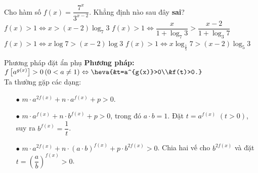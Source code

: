 \begin{ex}%
	Cho hàm số $f(x)=\dfrac{7^x}{3^{x-2}}$. Khẳng định nào sau đây \textbf{sai}?
	\choice
	{$f(x)>1\Leftrightarrow x>(x-2)\log_7 3$}
	{$f(x)>1\Leftrightarrow\dfrac{x}{1+\log_7 3}>\dfrac{x-2}{1+\log_3 7}$}
	{$f(x)>1\Leftrightarrow x\log 7>(x-2)\log 3$}
	{\True $f(x)>1\Leftrightarrow x\log_{\tfrac{1}{5}}7>(x-2)\log_5 3$}
\end{ex}
\begin{dang}{Phương pháp đặt ẩn phụ}
	\textbf{Phương pháp:} $f\left[a^{g(x)}\right]>0\,(0<a\neq 1)\Leftrightarrow\heva{&t=a^{g(x)}>0\\&f(t)>0.}$ \\
	Ta thường gặp các dạng:
	\begin{itemize}
		\item[$\bullet$] $m\cdot a^{2f(x)}+n\cdot a^{f(x)}+p>0$.
		\item[$\bullet$] $m\cdot a^{f(x)}+n\cdot b^{f(x)}+p>0$, trong đó $a\cdot b=1$. Đặt $t=a^{f(x)}$ $(t>0)$, suy ra $b^{f(x)}=\dfrac{1}{t}$.
		\item[$\bullet$] $m\cdot a^{2f(x)}+n\cdot (a\cdot b)^{f(x)}+p\cdot b^{2f(x)}>0$. Chia hai vế cho $b^{2f(x)}$ và đặt $t=\left(\dfrac{a}{b}\right)^{f(x)}>0$.
	\end{itemize}
\end{dang}
